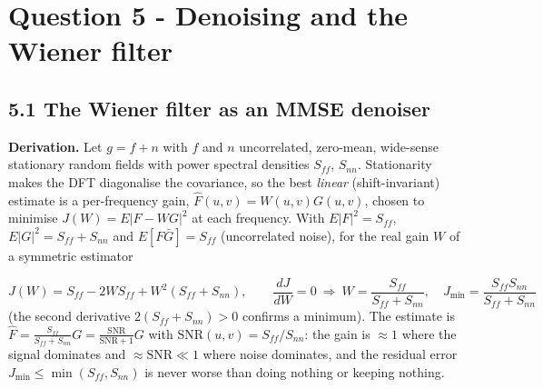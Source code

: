 \documentclass[10pt,a4paper]{article}
\begin{document}
\section{Question 5 - Denoising and the Wiener filter}
\subsection{5.1 The Wiener filter as an MMSE denoiser}
\textbf{Derivation.} Let $g=f+n$ with $f$ and $n$ uncorrelated, zero-mean, wide-sense stationary random fields with power spectral densities $S_{ff}$, $S_{nn}$. Stationarity makes the DFT diagonalise the covariance, so the best \textit{linear} (shift-invariant) estimate is a per-frequency gain, $\hat F(u,v)=W(u,v)G(u,v)$, chosen to minimise $J(W)=E|F-WG|^2$ at each frequency. With $E|F|^2=S_{ff}$, $E|G|^2=S_{ff}+S_{nn}$ and $E[F\bar G]=S_{ff}$ (uncorrelated noise), for the real gain $W$ of a symmetric estimator

\begin{equation}J(W)=S_{ff}-2W S_{ff}+W^{2}(S_{ff}+S_{nn}),\qquad \frac{dJ}{dW}=0\ \Rightarrow\ W=\frac{S_{ff}}{S_{ff}+S_{nn}},\quad J_{\min}=\frac{S_{ff}S_{nn}}{S_{ff}+S_{nn}}\end{equation}
(the second derivative $2(S_{ff}+S_{nn})>0$ confirms a minimum). The estimate is $\hat F=\frac{S_{ff}}{S_{ff}+S_{nn}}G=\frac{\mathrm{SNR}}{\mathrm{SNR}+1}G$ with $\mathrm{SNR}(u,v)=S_{ff}/S_{nn}$: the gain is $\approx1$ where the signal dominates and $\approx\mathrm{SNR}\ll1$ where noise dominates, and the residual error $J_{\min}\le\min(S_{ff},S_{nn})$ is never worse than doing nothing or keeping nothing.
\end{document}
